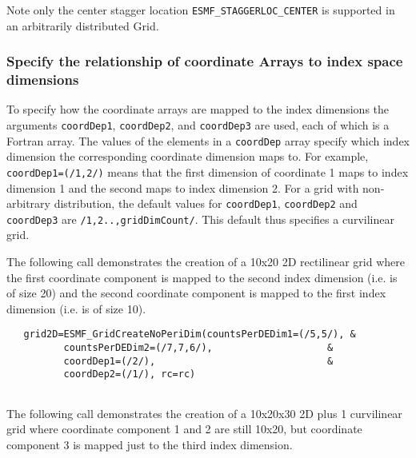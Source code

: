 
   Note only the center stagger location {\tt ESMF\_STAGGERLOC\_CENTER} is supported
   in an arbitrarily distributed Grid. 

  
  \subsubsection{Specify the relationship of coordinate Arrays
                 to index space dimensions}
  
   To specify how the coordinate arrays are mapped to the
   index dimensions the arguments {\tt coordDep1},
   {\tt coordDep2}, and {\tt coordDep3} are used, each
   of which is a Fortran array. The values of the elements
   in a {\tt coordDep} array specify which index dimension
   the corresponding coordinate dimension
   maps to.  For example, {\tt coordDep1=(/1,2/)} means that
   the first dimension of coordinate 1 maps to index
   dimension 1 and the second maps to index dimension 2.
   For a grid with non-arbitrary distribution, the default
   values for {\tt coordDep1}, {\tt coordDep2} and {\tt coordDep3}
   are {\tt /1,2..,gridDimCount/}.  This default
   thus specifies a curvilinear grid.
  
   The following call demonstrates the creation of a
   10x20 2D rectilinear grid where the first coordinate
   component is mapped to the second index dimension
   (i.e. is of size 20) and the second coordinate component
   is mapped to the first index dimension (i.e. is of size
   10). 

 \begin{verbatim}
   grid2D=ESMF_GridCreateNoPeriDim(countsPerDEDim1=(/5,5/), &
          countsPerDEDim2=(/7,7,6/),                    &
          coordDep1=(/2/),                              &
          coordDep2=(/1/), rc=rc)
 
\end{verbatim}
 

   The following call demonstrates the creation of a
   10x20x30 2D plus 1 curvilinear grid where
   coordinate component 1 and 2 are still 10x20, but
   coordinate component 3 is mapped just to the
   third index dimension. 

